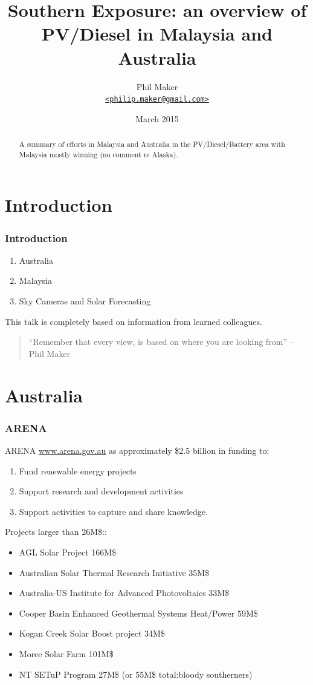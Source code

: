 \documentclass{beamer}
\title{Southern Exposure: an overview of PV/Diesel in Malaysia and
  Australia}
\author{Phil Maker\\
  \href{mailto:philip.maker@gmail.com}{\texttt{<philip.maker@gmail.com>}}
}
\institute{Alaskan Center for Energy and Power}
\date{March 2015}
\begin{document}
\begin{frame}
  \maketitle
  \vspace{-1.2cm}
  \begin{abstract}
    \small A summary of efforts in Malaysia and Australia in the
    PV/Diesel/Battery area with Malaysia mostly winning (no comment re
    Alaska).
  \end{abstract}
\end{frame}

\section{Introduction}
\begin{frame}\frametitle{Introduction}
  \begin{enumerate}
  \item Australia
  \item Malaysia
  \item Sky Cameras and Solar Forecasting
  \end{enumerate}

This talk is completely based on information from learned colleagues.
\pause
\vfill
\begin{quote}
``Remember that every view,
\pause
is based on where you are looking from'' -- Phil Maker
\end{quote}

\end{frame}

\section{Australia}
\begin{frame}\frametitle{ARENA}
  ARENA \href{www.arena.gov.au}{www.arena.gov.au} as approximately \$2.5 billion in funding to:
  \begin{enumerate}
  \item Fund renewable energy projects
  \item Support research and development activities
  \item Support activities to capture and share knowledge.
  \end{enumerate}
\pause
Projects larger than 26M\$::
\begin{itemize}
\item AGL Solar Project 166M\$
\item Australian Solar Thermal Research Initiative 35M\$
\item Australia-US Institute for Advanced Photovoltaics 33M\$
\item Cooper Basin Enhanced Geothermal Systems Heat/Power 59M\$
\item Kogan Creek Solar Boost project 34M\$
\item Moree Solar Farm 101M\$
\item NT SETuP Program 27M\$ (or 55M\$ total:bloody southerners)
\end{itemize}
\end{frame}
\end{document}
